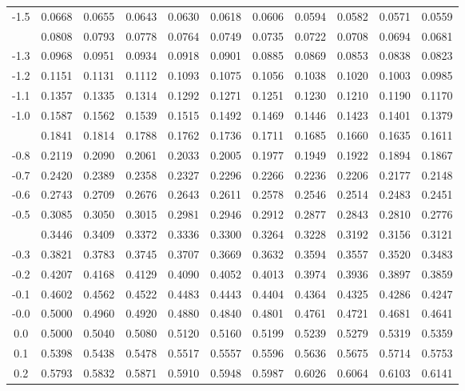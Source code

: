 \documentclass[12pt,a4paper]{article}
\begin{document}
\begin{enumerate}
\begin{center}
\begin{longtable}{ccccccccccc}
-1.5 & 0.0668 & 0.0655 & 0.0643 & 0.0630 & 0.0618 & 0.0606 & 0.0594 & 0.0582 & 0.0571 & 0.0559 \\
\addlinespace
-1.4 & 0.0808 & 0.0793 & 0.0778 & 0.0764 & 0.0749 & 0.0735 & 0.0722 & 0.0708 & 0.0694 & 0.0681 \\
-1.3 & 0.0968 & 0.0951 & 0.0934 & 0.0918 & 0.0901 & 0.0885 & 0.0869 & 0.0853 & 0.0838 & 0.0823 \\
-1.2 & 0.1151 & 0.1131 & 0.1112 & 0.1093 & 0.1075 & 0.1056 & 0.1038 & 0.1020 & 0.1003 & 0.0985 \\
-1.1 & 0.1357 & 0.1335 & 0.1314 & 0.1292 & 0.1271 & 0.1251 & 0.1230 & 0.1210 & 0.1190 & 0.1170 \\
-1.0 & 0.1587 & 0.1562 & 0.1539 & 0.1515 & 0.1492 & 0.1469 & 0.1446 & 0.1423 & 0.1401 & 0.1379 \\
\addlinespace
-0.9 & 0.1841 & 0.1814 & 0.1788 & 0.1762 & 0.1736 & 0.1711 & 0.1685 & 0.1660 & 0.1635 & 0.1611 \\
-0.8 & 0.2119 & 0.2090 & 0.2061 & 0.2033 & 0.2005 & 0.1977 & 0.1949 & 0.1922 & 0.1894 & 0.1867 \\
-0.7 & 0.2420 & 0.2389 & 0.2358 & 0.2327 & 0.2296 & 0.2266 & 0.2236 & 0.2206 & 0.2177 & 0.2148 \\
-0.6 & 0.2743 & 0.2709 & 0.2676 & 0.2643 & 0.2611 & 0.2578 & 0.2546 & 0.2514 & 0.2483 & 0.2451 \\
-0.5 & 0.3085 & 0.3050 & 0.3015 & 0.2981 & 0.2946 & 0.2912 & 0.2877 & 0.2843 & 0.2810 & 0.2776 \\
\addlinespace
-0.4 & 0.3446 & 0.3409 & 0.3372 & 0.3336 & 0.3300 & 0.3264 & 0.3228 & 0.3192 & 0.3156 & 0.3121 \\
-0.3 & 0.3821 & 0.3783 & 0.3745 & 0.3707 & 0.3669 & 0.3632 & 0.3594 & 0.3557 & 0.3520 & 0.3483 \\
-0.2 & 0.4207 & 0.4168 & 0.4129 & 0.4090 & 0.4052 & 0.4013 & 0.3974 & 0.3936 & 0.3897 & 0.3859 \\
-0.1 & 0.4602 & 0.4562 & 0.4522 & 0.4483 & 0.4443 & 0.4404 & 0.4364 & 0.4325 & 0.4286 & 0.4247 \\
-0.0 & 0.5000 & 0.4960 & 0.4920 & 0.4880 & 0.4840 & 0.4801 & 0.4761 & 0.4721 & 0.4681 & 0.4641 \\
\midrule
0.0 & 0.5000 & 0.5040 & 0.5080 & 0.5120 & 0.5160 & 0.5199 & 0.5239 & 0.5279 & 0.5319 & 0.5359 \\
0.1 & 0.5398 & 0.5438 & 0.5478 & 0.5517 & 0.5557 & 0.5596 & 0.5636 & 0.5675 & 0.5714 & 0.5753 \\
0.2 & 0.5793 & 0.5832 & 0.5871 & 0.5910 & 0.5948 & 0.5987 & 0.6026 & 0.6064 & 0.6103 & 0.6141 \\

\end{longtable}
\end{center}
\end{enumerate}
\end{document}
